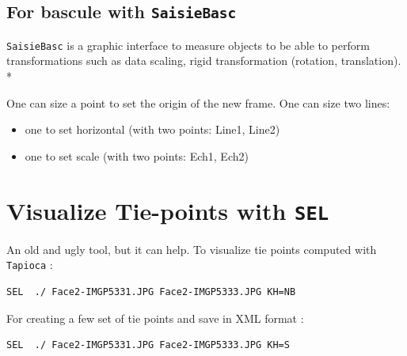 \subsection{For bascule with {\tt SaisieBasc}}
\label{SaisieBasc}

{\tt SaisieBasc} is a graphic interface to measure objects
to be able to perform transformations such as data scaling, rigid transformation (rotation, translation).\\*

One can size a point to set the origin of the new frame.
One can size two lines:
\begin{itemize}
\item one to set horizontal (with two points: Line1, Line2)
\item one to set scale (with two points: Ech1, Ech2)
\end{itemize}



\section{Visualize Tie-points with {\tt SEL}}

An old and ugly tool, but it can help. To visualize tie points computed with
{\tt Tapioca} :

\begin{verbatim}
SEL  ./ Face2-IMGP5331.JPG Face2-IMGP5333.JPG KH=NB
\end{verbatim}

For creating a few set of tie points and save in XML format :

\begin{verbatim}
SEL  ./ Face2-IMGP5331.JPG Face2-IMGP5333.JPG KH=S
\end{verbatim}



